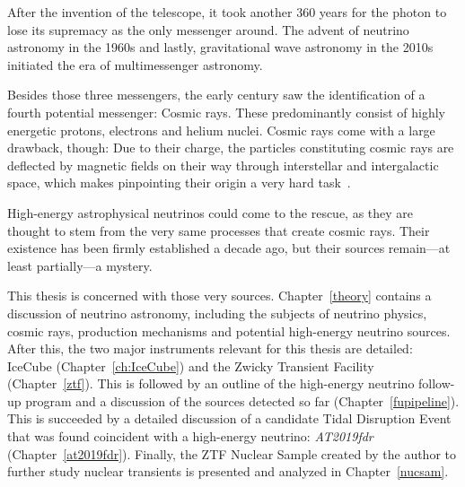 After the invention of the telescope, it took another 360 years for the photon to lose its supremacy as the only messenger around. The advent of neutrino astronomy in the 1960s and lastly, gravitational wave astronomy in the 2010s initiated the era of multimessenger astronomy.

Besides those three messengers, the early  century saw the identification of a fourth potential messenger: Cosmic rays. These predominantly consist of highly energetic protons, electrons and helium nuclei. Cosmic rays come with a large drawback, though: Due to their charge, the particles constituting cosmic rays are deflected by magnetic fields on their way through interstellar and intergalactic space, which makes pinpointing their origin a very hard task~\cite{Beckman2021}.

High-energy astrophysical neutrinos could come to the rescue, as they are thought to stem from the very same processes that create cosmic rays. Their existence has been firmly established a decade ago, but their sources remain---at least partially---a mystery.

This thesis is concerned with those very sources. Chapter~\ref{theory} contains a discussion of neutrino astronomy, including the subjects of neutrino physics, cosmic rays, production mechanisms and potential high-energy neutrino sources. After this, the two major instruments relevant for this thesis are detailed: IceCube (Chapter~\ref{ch:IceCube}) and the Zwicky Transient Facility (Chapter~\ref{ztf}). This is followed by an outline of the high-energy neutrino follow-up program and a discussion of the sources detected so far (Chapter~\ref{fupipeline}). This is succeeded by a detailed discussion of a candidate Tidal Disruption Event that was found coincident with a high-energy neutrino: \textit{AT2019fdr} (Chapter~\ref{at2019fdr}). Finally, the ZTF Nuclear Sample created by the author to further study nuclear transients is presented and analyzed in Chapter~\ref{nucsam}.
